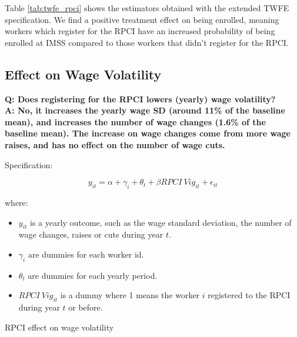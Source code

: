 \documentclass[oneside,11pt]{article}
\begin{document}
Table \ref{tab:twfe_rpci} shows the estimators obtained with the extended TWFE specification. We find a positive treatment effect on being enrolled, meaning workers which register for the RPCI have an increased probability of being enrolled at IMSS compared to those workers that didn't register for the RPCI.

\clearpage

\subsection{Effect on Wage Volatility}

\textbf{Q: Does registering for the RPCI lowers (yearly) wage volatility?}
\\
\textbf{A: No, it increases the yearly wage SD (around 11\% of the baseline mean), and increases the number of wage changes (1.6\% of the baseline mean). The increase on wage changes come from more wage raises, and has no effect on the number of wage cuts.}

Specification:

$$y_{it} = \alpha + \gamma_{i} + \theta_{t} + \beta RPCI\ Vig_{it} + \epsilon_{it}$$

where:

\begin{itemize}
    \item $y_{it}$ is a yearly outcome, such as the wage standard deviation, the number of wage changes, raises or cuts during year $t$.
    \item $\gamma_{i}$ are dummies for each worker id.
    \item $\theta_{t}$ are dummies for each yearly period.
    \item $RPCI\ Vig_{it}$ is a dummy where 1 means the worker $i$ registered to the RPCI during year $t$ or before.
\end{itemize}

\begin{table}[H]
    \caption{RPCI effect on wage volatility}
    \label{sal_cierre_sd_rpci}
    \begin{center}
    \scriptsize{}
    \end{center}
\end{table}
\end{document}
